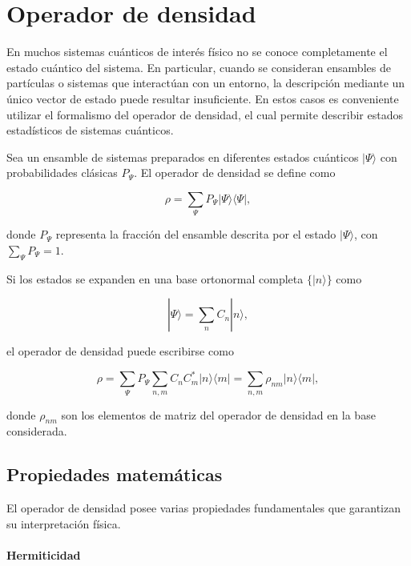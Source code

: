 \documentclass[11pt]{report}
\begin{document}
\section{Operador de densidad}

En muchos sistemas cuánticos de interés físico no se conoce completamente el estado cuántico del sistema. En particular, cuando se consideran ensambles de partículas o sistemas que interactúan con un entorno, la descripción mediante un único vector de estado puede resultar insuficiente. En estos casos es conveniente utilizar el formalismo del operador de densidad, el cual permite describir estados estadísticos de sistemas cuánticos.

Sea un ensamble de sistemas preparados en diferentes estados cuánticos $|\Psi\rangle$ con probabilidades clásicas $P_{\Psi}$. El operador de densidad se define como

\begin{equation}
\rho = \sum_{\Psi} P_{\Psi} |\Psi\rangle \langle \Psi|,
\end{equation}

donde $P_{\Psi}$ representa la fracción del ensamble descrita por el estado $|\Psi\rangle$, con $\sum_{\Psi} P_{\Psi} = 1$.

Si los estados se expanden en una base ortonormal completa $\{|n\rangle\}$ como

\begin{equation}
|\Psi\rangle = \sum_n C_n |n\rangle,
\end{equation}

el operador de densidad puede escribirse como

\begin{equation}
\rho =
\sum_{\Psi} P_{\Psi}
\sum_{n,m} C_n C_m^*
|n\rangle \langle m|
=
\sum_{n,m} \rho_{nm}|n\rangle\langle m|,
\end{equation}

donde $\rho_{nm}$ son los elementos de matriz del operador de densidad en la base considerada.

\subsection{Propiedades matemáticas}

El operador de densidad posee varias propiedades fundamentales que garantizan su interpretación física.

\paragraph{Hermiticidad}
\end{document}
